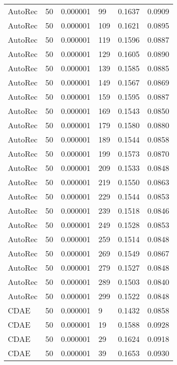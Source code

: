 \begin{tabular}{llrlrr}
 AutoRec &   50 &  0.000001 &    99 &  0.1637 &       0.0909 \\
 AutoRec &   50 &  0.000001 &   109 &  0.1621 &       0.0895 \\
 AutoRec &   50 &  0.000001 &   119 &  0.1596 &       0.0887 \\
 AutoRec &   50 &  0.000001 &   129 &  0.1605 &       0.0890 \\
 AutoRec &   50 &  0.000001 &   139 &  0.1585 &       0.0885 \\
 AutoRec &   50 &  0.000001 &   149 &  0.1567 &       0.0869 \\
 AutoRec &   50 &  0.000001 &   159 &  0.1595 &       0.0887 \\
 AutoRec &   50 &  0.000001 &   169 &  0.1543 &       0.0850 \\
 AutoRec &   50 &  0.000001 &   179 &  0.1580 &       0.0880 \\
 AutoRec &   50 &  0.000001 &   189 &  0.1544 &       0.0858 \\
 AutoRec &   50 &  0.000001 &   199 &  0.1573 &       0.0870 \\
 AutoRec &   50 &  0.000001 &   209 &  0.1533 &       0.0848 \\
 AutoRec &   50 &  0.000001 &   219 &  0.1550 &       0.0863 \\
 AutoRec &   50 &  0.000001 &   229 &  0.1544 &       0.0853 \\
 AutoRec &   50 &  0.000001 &   239 &  0.1518 &       0.0846 \\
 AutoRec &   50 &  0.000001 &   249 &  0.1528 &       0.0853 \\
 AutoRec &   50 &  0.000001 &   259 &  0.1514 &       0.0848 \\
 AutoRec &   50 &  0.000001 &   269 &  0.1549 &       0.0867 \\
 AutoRec &   50 &  0.000001 &   279 &  0.1527 &       0.0848 \\
 AutoRec &   50 &  0.000001 &   289 &  0.1503 &       0.0840 \\
 AutoRec &   50 &  0.000001 &   299 &  0.1522 &       0.0848 \\
    CDAE &   50 &  0.000001 &     9 &  0.1432 &       0.0858 \\
    CDAE &   50 &  0.000001 &    19 &  0.1588 &       0.0928 \\
    CDAE &   50 &  0.000001 &    29 &  0.1624 &       0.0918 \\
    CDAE &   50 &  0.000001 &    39 &  0.1653 &       0.0930 \\

\end{tabular}

